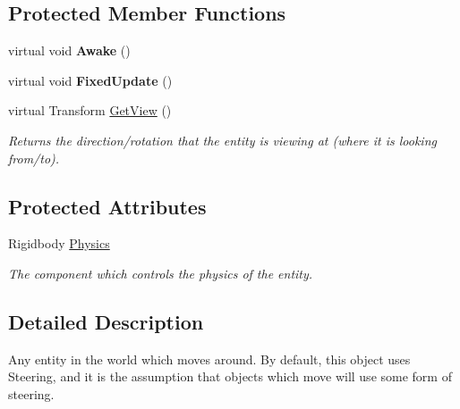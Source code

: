 \subsection*{Protected Member Functions}
\begin{DoxyCompactItemize}
\item 
\hypertarget{class_skyrates_1_1_entity_1_1_entity_dynamic_a503b81a15deedefda63fcab4d30958d1}{virtual void {\bfseries Awake} ()}\label{class_skyrates_1_1_entity_1_1_entity_dynamic_a503b81a15deedefda63fcab4d30958d1}

\item 
\hypertarget{class_skyrates_1_1_entity_1_1_entity_dynamic_a3b42aad02be7ef1201b1b88f0b87feaa}{virtual void {\bfseries Fixed\-Update} ()}\label{class_skyrates_1_1_entity_1_1_entity_dynamic_a3b42aad02be7ef1201b1b88f0b87feaa}

\item 
virtual Transform \hyperlink{class_skyrates_1_1_entity_1_1_entity_dynamic_af4716ad1188a8ce8564d7165e0a133c1}{Get\-View} ()
\begin{DoxyCompactList}\small\item\em Returns the direction/rotation that the entity is viewing at (where it is looking from/to). \end{DoxyCompactList}\end{DoxyCompactItemize}
\subsection*{Protected Attributes}
\begin{DoxyCompactItemize}
\item 
Rigidbody \hyperlink{class_skyrates_1_1_entity_1_1_entity_dynamic_af5b8ec5d728a356e1216f9eaca0e6bdc}{Physics}
\begin{DoxyCompactList}\small\item\em The component which controls the physics of the entity. \end{DoxyCompactList}\end{DoxyCompactItemize}


\subsection{Detailed Description}
Any entity in the world which moves around. By default, this object uses Steering, and it is the assumption that objects which move will use some form of steering. 



